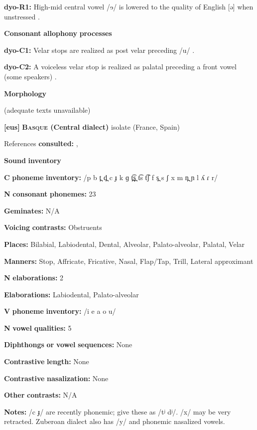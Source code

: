 \textbf{dyo-R1:} High-mid central vowel /ɘ/ is lowered to the quality of English [ə] when unstressed \citep[6]{Sapir1965}.

\textbf{Consonant} \textbf{allophony} \textbf{processes}

\textbf{dyo-C1:} Velar stops are realized as post velar preceding /u/ \citep[5]{Sapir1965}.

\textbf{dyo-C2:} A voiceless velar stop is realized as palatal preceding a front vowel (some speakers) \citep{Sapir1965}.

\textbf{Morphology}

(adequate texts unavailable)

\textbf{[eus]}   \textbf{\textsc{Basque} \textbf{(Central} \textbf{dialect)}}  isolate (France, Spain)

References \textbf{consulted:} \citet{Hualde2003}, \citet{SaltarelliEtAl1988}

\textbf{Sound} \textbf{inventory}

\textbf{C} \textbf{phoneme} \textbf{inventory:} /p b t̪ d̪ c ɟ k ɡ t̪͡s̪ t͡s t͡ʃ f s̪ s ʃ x m n̪ ɲ l ʎ ɾ r/

\textbf{N} \textbf{consonant} \textbf{phonemes:} 23

\textbf{Geminates:} N/A

\textbf{Voicing} \textbf{contrasts:} Obstruents

\textbf{Places:} Bilabial, Labiodental, Dental, Alveolar, Palato-alveolar, Palatal, Velar

\textbf{Manners:} Stop, Affricate, Fricative, Nasal, Flap/Tap, Trill, Lateral approximant

\textbf{N} \textbf{elaborations:} 2

\textbf{Elaborations:} Labiodental, Palato-alveolar

\textbf{V} \textbf{phoneme} \textbf{inventory:} /i e a o u/

\textbf{N} \textbf{vowel} \textbf{qualities:} 5

\textbf{Diphthongs} \textbf{or} \textbf{vowel} \textbf{sequences:} None

\textbf{Contrastive} \textbf{length:} None

\textbf{Contrastive} \textbf{nasalization:} None

\textbf{Other} \textbf{contrasts:} N/A

\textbf{Notes:} /c ɟ/ are recently phonemic; \citet{SaltarelliEtAl1988} give these as /tʲ dʲ/. /x/ may be very retracted. Zuberoan dialect also has /y/ and phonemic nasalized vowels.

